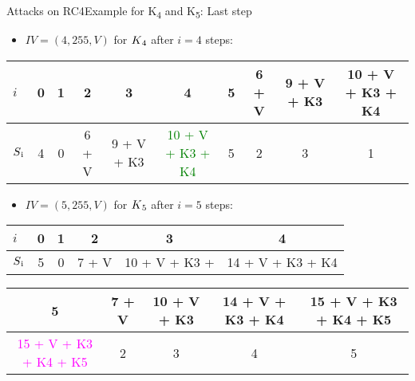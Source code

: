 \documentclass[
	aspectratio=169,	%
	onlytextwidth,		%
	t,					%
	]{beamer}
\begin{document}
\begin{frame}[fragile]{Attacks on RC4}{Example for K\textsubscript{4} and K\textsubscript{5}: Last step}
	\begin{itemize}
		\item $IV = (4,255,V)$ for $K\textsubscript{4}$ after $i=4$ steps:
	\end{itemize}

	\small
	
	\begin{table}[h!]
		\begin{center}
			\begin{tabular}{l|c|c|c|c|c|c|c|c|c}
			$i$ & 0 & 1 & 2 & 3 & 4 & 5 & 6 + V & 9 + V + K3 & 10 + V + K3 + K4\\
			\hline
			$S\textsubscript{i}$ & 4 & 0 & 6 + V & 9 + V + K3 & \textcolor{green}{10 + V + K3 + K4} & 5 & 2 & 3 & 1\\
			\end{tabular}
		\end{center}
	\end{table}

	\normalsize

	\begin{itemize}
		\item $IV = (5,255,V)$ for $K\textsubscript{5}$ after $i=5$ steps:
	\end{itemize}

	\small

	\begin{table}[h!]
		\begin{center}
			\begin{tabular}{l|c|c|c|c|c}
			$i$ & 0 & 1 & 2 & 3 & 4\\
			\hline
			$S\textsubscript{i}$ & 5 & 0 & 7 + V & 10 + V + K3 + & 14 + V + K3 + K4\\
			\end{tabular}
		\end{center}
	\end{table}

	\begin{table}[h!]
		\begin{center}
			\begin{tabular}{c|c|c|c|c}
			5 & 7 + V & 10 + V + K3 & 14 + V + K3 + K4 & 15 + V + K3 + K4 + K5\\
			\hline
			\textcolor{magenta}{15 + V + K3 + K4 + K5} & 2 & 3 & 4 & 5\\
			\end{tabular}
		\end{center}
	\end{table}

	\normalsize

\end{frame}
\end{document}
